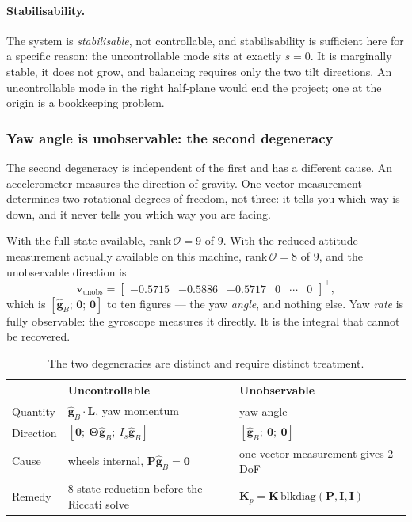 \paragraph{Stabilisability.} The system is \emph{stabilisable}, not
controllable, and stabilisability is sufficient here for a specific reason:
the uncontrollable mode sits at exactly $s = 0$. It is marginally stable, it
does not grow, and balancing requires only the two tilt directions. An
uncontrollable mode in the right half-plane would end the project; one at the
origin is a bookkeeping problem.

\subsubsection{Yaw angle is unobservable: the second degeneracy}
\label{sec:unobservable}

The second degeneracy is independent of the first and has a different cause.
An accelerometer measures the direction of gravity. One vector measurement
determines two rotational degrees of freedom, not three: it tells you which
way is down, and it never tells you which way you are facing.

With the full state available, $\mathrm{rank}\,\mathcal{O} = 9$ of $9$. With
the reduced-attitude measurement actually available on this machine,
$\mathrm{rank}\,\mathcal{O} = 8$ of $9$, and the unobservable direction is
%
\begin{equation}
  \bm{v}_{\mathrm{unobs}} =
  \begin{bmatrix}-0.5715 & -0.5886 & -0.5717 & 0 & \cdots & 0\end{bmatrix}^{\top},
\end{equation}
%
which is $[\hat{\bm{g}}_B;\,\bm{0};\,\bm{0}]$ to ten figures --- the yaw
\emph{angle}, and nothing else. Yaw \emph{rate} is fully observable: the
gyroscope measures it directly. It is the integral that cannot be recovered.

\begin{table}[htbp]
\centering
\small
\begin{tabular}{@{}lll@{}}
\toprule
 & \textbf{Uncontrollable} & \textbf{Unobservable}\\
\midrule
Quantity & $\hat{\bm{g}}_B\!\cdot\!\bm{L}$, yaw momentum & yaw angle\\
Direction & $[\bm{0};\ \bm{\Theta}\hat{\bm{g}}_B;\ I_s\hat{\bm{g}}_B]$
          & $[\hat{\bm{g}}_B;\ \bm{0};\ \bm{0}]$\\
Cause & wheels internal, $\bm{P}\hat{\bm{g}}_B = \bm{0}$
      & one vector measurement gives 2 DoF\\
Remedy & 8-state reduction before the Riccati solve
       & $\bm{K}_p = \bm{K}\,\mathrm{blkdiag}(\bm{P},\bm{I},\bm{I})$\\
\bottomrule
\end{tabular}
\caption{The two degeneracies are distinct and require distinct treatment.}
\label{tab:degeneracies}
\end{table}

